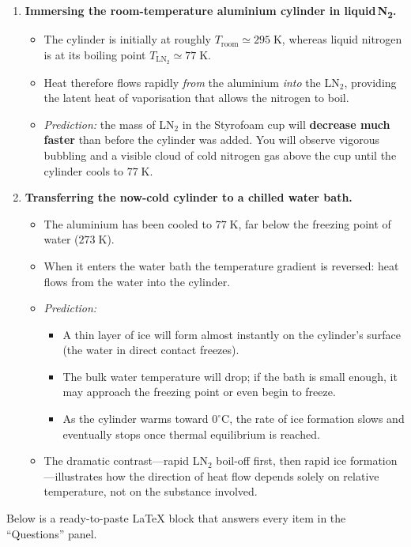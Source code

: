 \documentclass[12pt]{article}
\theoremstyle{definition} %
\theoremstyle{plain} %
\begin{document}
\begin{enumerate}
  \item \textbf{Immersing the room-temperature aluminium cylinder in liquid\,N\textsubscript{2}.}
        \begin{itemize}
          \item The cylinder is initially at roughly \(T_{\text{room}}\simeq 295\;\text{K}\), 
                whereas liquid nitrogen is at its boiling point
                \(T_{\text{LN}_{2}}\simeq 77\;\text{K}\).
          \item Heat therefore flows rapidly \emph{from} the aluminium \emph{into} the LN\(_2\),
                providing the latent heat of vaporisation that allows the nitrogen to boil.
          \item \emph{Prediction:} the mass of LN\(_2\) in the Styrofoam cup will
                \textbf{decrease much faster} than before the cylinder was added.
                You will observe vigorous bubbling and a visible cloud of cold
                nitrogen gas above the cup until the cylinder cools to \(77\;\text{K}\).
        \end{itemize}

  \item \textbf{Transferring the now-cold cylinder to a chilled water bath.}
        \begin{itemize}
          \item The aluminium has been cooled to \(77\;\text{K}\), far below the
                freezing point of water (\(273\;\text{K}\)).
          \item When it enters the water bath the temperature gradient is reversed:
                heat flows from the water into the cylinder.
          \item \emph{Prediction:}
                \begin{itemize}
                  \item A thin layer of ice will form almost instantly on the cylinder’s surface
                        (the water in direct contact freezes).
                  \item The bulk water temperature will drop; if the bath is small enough, it may
                        approach the freezing point or even begin to freeze.
                  \item As the cylinder warms toward \(0^\circ\text{C}\), the rate of ice formation
                        slows and eventually stops once thermal equilibrium is reached.
                \end{itemize}
          \item The dramatic contrast—rapid LN\(_2\) boil-off first, then rapid ice formation—illustrates how the direction of heat flow depends solely on relative temperature, not on the substance involved.
        \end{itemize}
\end{enumerate}
Below is a ready-to-paste LaTeX block that answers every item in the “Questions” panel.
\end{document}
